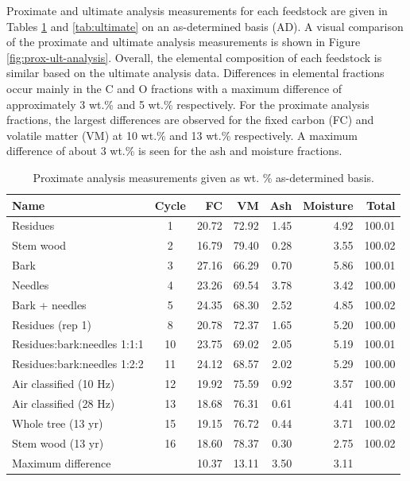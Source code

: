 Proximate and ultimate analysis measurements for each feedstock are given in Tables \ref{tab:proximate} and \ref{tab:ultimate} on an as-determined basis (AD). A visual comparison of the proximate and ultimate analysis measurements is shown in Figure \ref{fig:prox-ult-analysis}. Overall, the elemental composition of each feedstock is similar based on the ultimate analysis data. Differences in elemental fractions occur mainly in the C and O fractions with a maximum difference of approximately 3 wt.\% and 5 wt.\% respectively. For the proximate analysis fractions, the largest differences are observed for the fixed carbon (FC) and volatile matter (VM) at 10 wt.\% and 13 wt.\% respectively. A maximum difference of about 3 wt.\% is seen for the ash and moisture fractions.

\begin{table}[H]
    \caption{Proximate analysis measurements given as wt. \% as-determined basis.}
    \label{tab:proximate}
    \centering
    \begin{tabular}{lcrrrrr}
        \toprule
        Name & Cycle & FC & VM & Ash & Moisture & Total \\
        \midrule
        Residues                    & 1  & 20.72 & 72.92 & 1.45 & 4.92 & 100.01 \\
        Stem wood                   & 2  & 16.79 & 79.40 & 0.28 & 3.55 & 100.02 \\
        Bark                        & 3  & 27.16 & 66.29 & 0.70 & 5.86 & 100.01 \\
        Needles                     & 4  & 23.26 & 69.54 & 3.78 & 3.42 & 100.00 \\
        Bark + needles              & 5  & 24.35 & 68.30 & 2.52 & 4.85 & 100.02 \\
        Residues (rep 1)            & 8  & 20.78 & 72.37 & 1.65 & 5.20 & 100.00 \\
        Residues:bark:needles 1:1:1 & 10 & 23.75 & 69.02 & 2.05 & 5.19 & 100.01 \\
        Residues:bark:needles 1:2:2 & 11 & 24.12 & 68.57 & 2.02 & 5.29 & 100.00 \\
        Air classified (10 Hz)      & 12 & 19.92 & 75.59 & 0.92 & 3.57 & 100.00 \\
        Air classified (28 Hz)      & 13 & 18.68 & 76.31 & 0.61 & 4.41 & 100.01 \\
        Whole tree (13 yr)          & 15 & 19.15 & 76.72 & 0.44 & 3.71 & 100.02 \\
        Stem wood (13 yr)           & 16 & 18.60 & 78.37 & 0.30 & 2.75 & 100.02 \\
        \cmidrule{3-6}
        \multicolumn{2}{l}{Maximum difference} & 10.37 & 13.11 & 3.50 & 3.11 & \\
        \bottomrule
    \end{tabular}
\end{table}

